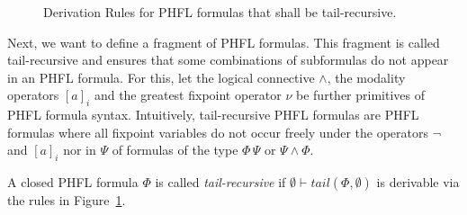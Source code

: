 \begin{figure}
    \caption{Derivation Rules for PHFL formulas that shall be tail-recursive.}
    \label{figure:phfl-tail-recursive}
\end{figure}

Next, we want to define a fragment of PHFL formulas. This fragment is called tail-recursive and ensures that
some combinations of subformulas do not appear in an PHFL formula. For this, let the logical connective
$\wedge$, the modality operators $[a]_i$ and the greatest fixpoint operator $\nu$ be further primitives of PHFL formula
syntax. Intuitively, tail-recursive PHFL formulas are PHFL formulas where all fixpoint variables do not occur freely
under the operators $\neg$ and $[a]_i$ nor in $\Psi$ of formulas of the type $\Phi\,\Psi$ or $\Psi \wedge \Phi$.

\begin{definition}
    A closed PHFL formula $\Phi$ is called \emph{tail-recursive} if $\emptyset \vdash tail(\Phi, \emptyset)$ is
    derivable via the rules in Figure~\ref{figure:phfl-tail-recursive}.
\end{definition}

